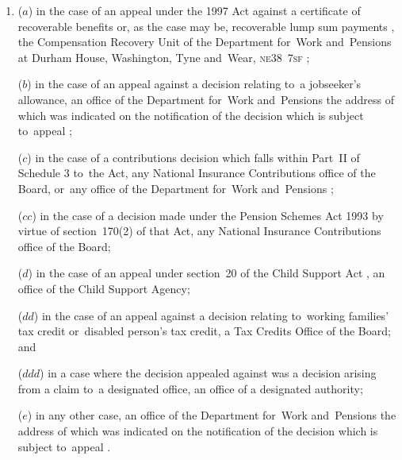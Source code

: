 \documentclass[12pt,a4paper]{article}
\begin{document}
\begin{enumerate}\item[]
($a$) in the case of an appeal under the 1997 Act against a certificate of recoverable benefits
or, as the case may be, recoverable lump sum payments%
, the Compensation Recovery Unit of the 
Department for~Work and~Pensions  %
at 
Durham House, Washington, Tyne and~Wear, \textsc{\lowercase{NE38~7SF}}%
;

($b$) in the case of an appeal against a decision relating to~a jobseeker’s allowance, an office of the 
Department for~Work and~Pensions the address of which was indicated on the notification of the decision which is subject to~appeal%
;

($c$) in the case of a contributions decision which falls within Part~II of Schedule 3 to~the Act, any National Insurance Contributions office
of the Board, or~any office of the 
Department for~Work and~Pensions%
;  %

($cc$) in the case of a decision made under the Pension Schemes Act 1993 by virtue of section~170(2) of that Act, any National Insurance Contributions office of the Board;

($d$) in the case of an appeal under section~20 of the Child Support Act%
, an office of the Child Support Agency; %

($dd$) in the case of an appeal against a decision relating to~working families' tax credit or~disabled person’s tax credit, a Tax Credits Office of the Board; and

($ddd$) in a case where the decision appealed against was a decision arising from a claim to~a designated office, an office of a designated authority;

($e$) in any other case, an office of the 
Department for~Work and~Pensions the address of which was indicated on the notification of the decision which is subject to~appeal%
.
\end{enumerate}
\end{document}
